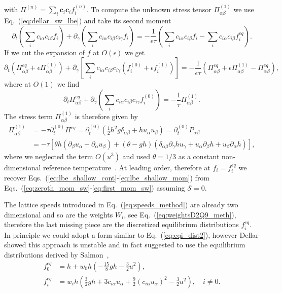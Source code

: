 with $\Pi^{(n)} = \sum_i \mathbf{c}_i\mathbf{c}_i f_i^{(n)}$.
To compute the unknown stress tensor $\Pi^{(1)}_{\alpha\beta}$ we use Eq.~(\ref{eq:dellar_sw_lbe}) and take its second moment
\begin{equation}
    \partial_t \left(\sum_i c_{i\alpha}c_{i\beta} f_i\right) + \partial_{\gamma}\left(\sum_i c_{i\alpha}c_{i\beta}c_{i\gamma} f_i\right) = -\frac{1}{\epsilon\tau}\left(\sum_i c_{i\alpha}c_{i\beta} f_i - \sum_ic_{i\alpha}c_{i\beta} f_i^{eq}\right).
\end{equation}
If we cut the expansion of $f$ at $O(\epsilon)$ we get
\begin{equation}
    \partial_t\left(\Pi^{eq}_{\alpha\beta} + \epsilon\Pi^{(1)}_{\alpha\beta}\right) + \partial_{\gamma}\left[\sum_i c_{i\alpha}c_{i\beta}c_{i\gamma} (f^{(0)}_i + \epsilon f^{(1)}_i)\right] = -\frac{1}{\epsilon\tau}\left(\Pi^{eq}_{\alpha\beta} + \epsilon\Pi^{(1)}_{\alpha\beta} - \Pi^{eq}_{\alpha\beta}\right),
\end{equation}
where at $O(1)$ we find
\begin{equation}
    \partial_t\Pi^{eq}_{\alpha\beta} + \partial_{\gamma}\left(\sum_i c_{i\alpha}c_{i\beta}c_{i\gamma} f^{(0)}_i\right) = -\frac{1}{\tau}\Pi^{(1)}_{\alpha\beta}.
\end{equation}
The stress term $\Pi_{\alpha\beta}^{(1)}$ is therefore given by
\begin{align}
    \Pi^{(1)}_{\alpha\beta} &= -\tau\partial_t^{(0)}\Pi^{eq} = \partial_t^{(0)}\left(\frac{1}{2}h^2 g\delta_{\alpha\beta} + h u_{\alpha}u_{\beta}\right) =  \partial_t^{(0)}P_{\alpha\beta} \\
     &= -\tau\left[\theta h(\partial_{\beta}u_{\alpha} + \partial_{\alpha}u_{\beta}) + \left(\theta - gh\right)(\delta_{\alpha\beta}\partial_{\gamma}h u_{\gamma} + u_{\alpha}\partial_{\beta}h + u_{\beta}\partial_{\alpha}h)\right],
\end{align}
where we neglected the term $O(u^3)$ and used $\theta = 1/3$ as a constant non-dimensional reference temperature~\cite{dellarNonhydrodynamicModesPriori2002}.
At leading order, therefore at $f_i = f_i^{eq}$ we recover Eqs.~(\ref{eq:lbe_shallow_cont}-\ref{eq:lbe_shallow_mom}) from Eqs.~(\ref{eq:zeroth_mom_sw}-\ref{eq:first_mom_sw}) assuming $\mathcal{S} = 0$.

The lattice speeds introduced in Eq.~(\ref{eq:speeds_method}) are already two dimensional and so are the weights $W_i$, see Eq.~(\ref{eq:weightsD2Q9_meth}), therefore the last missing piece are the discretized equilibrium distributions $f_i^{eq}$.
In principle we could adopt a form similar to Eq.~(\ref{eq:eqi_dist2}), however Dellar showed this approach is unstable and in fact suggested to use the equilibrium distributions derived by Salmon~\cite{dellarNonhydrodynamicModesPriori2002, salmonLatticeBoltzmannMethod1999},
\begin{align}
    f^{eq}_0 &= h + w_0h\left(-\frac{15}{8}gh - \frac{3}{2}u^2\right),\\
    f^{eq}_i &= w_i h\left(\frac{3}{2}gh + 3 c_{i\alpha}u_{\alpha} + \frac{9}{2}(c_{i\alpha}u_{\alpha})^2 - \frac{3}{2}u^2\right), \quad i\neq 0 .
\end{align}

